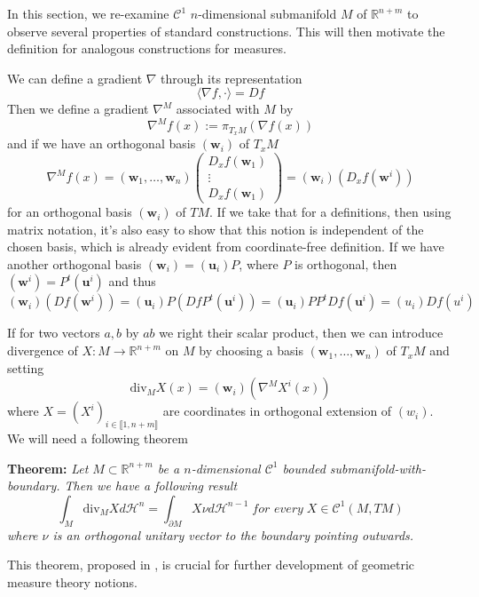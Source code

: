 In this section, we re-examine $\mathcal C^1$ $n$-dimensional submanifold $M$
of $\mathbb R^{n+m}$ to observe several properties of standard constructions.
This will then motivate the definition for analogous constructions for measures.

\vspace{2ex}
We can define a gradient $\nabla$ through its representation
\[\langle \nabla f, \cdot\rangle=Df\]
Then we define a gradient $\nabla^M$ associated with $M$ by
\[\nabla^M f(x) := \pi_{T_xM}(\nabla f(x))\]
and if we have an orthogonal basis $(\mathbf w_i)$ of $T_xM$
\[\nabla^M f(x) = (\mathbf w_1,\ldots,\mathbf w_n)\left(\begin{array}{c}D_xf(\mathbf w_1)\\ \vdots\\D_xf(\mathbf w_1)\end{array}\right)=(\mathbf w_i)(D_xf(\mathbf w^i))\]
for an orthogonal basis $(\mathbf w_i)$ of $TM$. If we take that for a definitions, then
using matrix notation, it's also easy to show that this notion is independent of the chosen basis,
which is already evident from coordinate-free definition. If we have another
orthogonal basis $(\mathbf w_i)=(\mathbf u_i)P$, where $P$ is orthogonal, 
then $(\mathbf w^i)=P^t(\mathbf u^i)$ and thus $(\mathbf w_i)(Df(\mathbf w^i))
=(\mathbf u_i)P(DfP^t(\mathbf u^i))=(\mathbf u_i)PP^tDf(\mathbf u^i)=(u_i)Df(u^i)$

\vspace{2ex}
If for two vectors $a,b$ by $ab$ we right their scalar product, then we can
introduce divergence of $X:M\rightarrow\mathbb R^{n+m}$ on $M$ by choosing
a basis $(\mathbf w_1,\ldots,\mathbf w_n)$ of $T_xM$ and setting
\[\text{div}_MX(x)=(\mathbf w_i)(\nabla^MX^i(x))\]
where $X=(X^i)_{i\in\llbracket1,n+m\rrbracket}$ are coordinates in orthogonal
extension of $(w_i)$. We will need a following theorem

\vspace{2ex}
\textbf{Theorem:} \textit{Let $M\subset \mathbb R^{n+m}$ be a $n$-dimensional
$\mathcal C^1$ bounded submanifold-with-boundary. Then we have a following result}
\[\int_M \text{div}_MXd\mathcal H^n=\int_{\partial M}X\nu d\mathcal H^{n-1}\;\textit{for every}\;X\in\mathcal C^1(M,TM)\]
\textit{where $\nu$ is an orthogonal unitary vector to the boundary pointing outwards.}

This theorem, proposed in \cite{simon}, is crucial for further development
of geometric measure theory notions.

